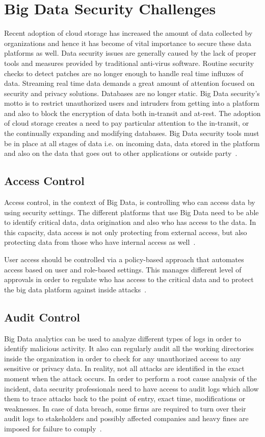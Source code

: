 \section{Big Data Security Challenges}
Recent adoption of cloud storage has increased the amount of data
collected by organizations and hence it has become of vital 
importance to secure these data platforms as well. Data security 
issues are generally caused by the lack of proper tools and
measures provided by traditional anti-virus software. Routine
security checks to detect patches are no longer enough to 
handle real time influxes of data. Streaming real time data 
demands a great amount of attention focused on security and 
privacy solutions. Databases are no longer static. Big Data 
security's motto is to restrict unauthorized users and 
intruders from getting into a platform and also to block 
the encryption of data both in-transit and at-rest.  The
adoption of cloud storage creates a need to pay particular 
attention to the in-transit, or the continually expanding and 
modifying databases. Big Data security tools must be in place 
at all stages of data i.e. on incoming data, data stored in the 
platform and also on the data that goes out to other 
applications or outside party~\cite{datamation}.

\subsection{Access Control}
Access control, in the context of Big Data, is controlling who can
access data by using security settings. The different platforms 
that use Big Data need to be able to identify critical data,
data origination and also who has access to the data. In this
capacity, data access is not only protecting from external
access, but also protecting data from those who have 
internal access as well~\cite{rahmaniamathematical}.

User access should be controlled via a policy-based approach
that automates access based on user and role-based settings.
This manages different level of approvals in order to regulate
who has access to the critical data and to protect the
big data platform against inside attacks~\cite{dataconomy}.

\subsection{Audit Control}
Big Data analytics can be used to analyze different types of
logs in order to identify malicious activity. It also can
regularly audit all the working directories inside the 
organization in order to check for any unauthorized access
to any sensitive or privacy data. In reality, not all 
attacks are identified in the exact moment when the attack
occurs. In order to perform a root cause analysis of the 
incident, data security professionals need to have access 
to audit logs which allow them to trace attacks back to the
point of entry, exact time, modifications or weaknesses. 
In case of data breach, some firms are required to turn over
their audit logs to stakeholders and possibly affected 
companies and heavy fines are imposed for failure 
to comply~\cite{csasecurity}. 

